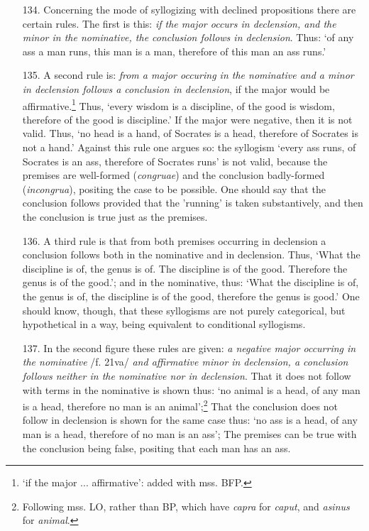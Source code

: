 \documentclass[]{article}
\begin{document}
\begin{itemize}
\item[134.] Concerning the mode of syllogizing with declined propositions there are certain rules. The first is this: \textit{if the major occurs in declension, and the minor in the nominative, the conclusion follows in declension}. Thus: `of any ass a man runs, this man is a man, therefore of this man an ass runs.' 
\item[135.] A second rule is: \textit{from a major occuring in the nominative and a minor in declension follows a conclusion in declension}, if the major would be affirmative.\footnote{`if the major ... affirmative': added with mss. BFP.} Thus, `every wisdom is a discipline, of the good is wisdom, therefore of the good is discipline.' If the major were negative, then it is not valid. Thus, `no head is a hand, of Socrates is a head, therefore of Socrates is not a hand.' Against this rule one argues so: the syllogism `every ass runs, of Socrates is an ass, therefore of Socrates runs' is not valid, because the premises are well-formed (\textit{congruae}) and the conclusion badly-formed (\textit{incongrua}), positing the case to be possible. One should say that the conclusion follows provided that the 'running' is taken substantively, and then the conclusion is true just as the premises. 
\item[136.] A third rule is that from both premises occurring in declension a conclusion follows both in the nominative and in declension. Thus, `What the discipline is of, the genus is of. The discipline is of the good. Therefore the genus is of the good.'; and in the nominative, thus: `What the discipline is of, the genus is of, the discipline is of the good, therefore the genus is good.' One should know, though, that these syllogisms are not purely categorical, but hypothetical in a way, being equivalent to conditional syllogisms.
\item[137.] In the second figure these rules are given: \textit{a negative major occurring in the nominative} /f. 21va/ \textit{and affirmative minor in declension, a conclusion follows neither in the nominative nor in declension}. That it does not follow with terms in the nominative is shown thus: `no animal is a head, of any man is a head, therefore no man is an animal';\footnote{Following mss. LO, rather than BP, which have \textit{capra} for \textit{caput}, and \textit{asinus} for \textit{animal}.} That the conclusion does not follow in declension is shown for the same case thus: `no ass is a head, of any man is a head, therefore of no man is an ass'; The premises can be true with the conclusion being false, positing that each man has an ass.

\end{itemize}
\end{document}
